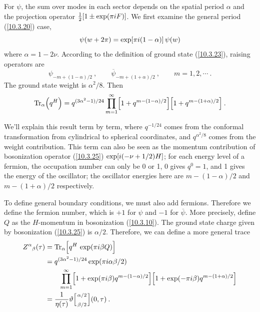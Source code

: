 	For $\psi$, the sum over modes in each sector depends on the spatial period $\alpha$ and the projection operator $\frac{1}{2}[1\pm\exp(\pi i F)]$. We first examine the general period (\ref{10.3.20}) case,
	\begin{equation}
		\psi(w+2\pi) =\exp[\pi i(1-\alpha)]\,\psi(w) \label{10.7.4}
	\end{equation}
	where $\alpha=1-2\nu$. According to the definition of ground state (\ref{10.3.23}), raising operators are
	\begin{equation}
		\psi_{-m+(1-\alpha)/2}\:,\qquad \overline{\psi}_{-m+(1+\alpha)/2}\:,   \qquad m=1,2,\cdots \:.\label{10.7.5}
	\end{equation}
	The ground state weight is $\alpha^{2}/8$. Then
	\begin{equation}
		\operatorname{Tr}_{\alpha}\Bigl(q^{H}\Bigr) = q^{(3\alpha^{2}-1)/24}\prod_{m=1}^{\infty}\Bigl[1+q^{m-(1-\alpha)/2}\Bigr]
		\Bigl[1+q^{m-(1+\alpha)/2}\Bigr]\:.\label{10.7.6}
	\end{equation}
	\begin{tcolorbox}[breakable]
		\noindent We'll explain this result term by term, where $q^{-1/24}$ comes from the conformal transformation from cylindrical to spherical coordinates, and $q^{\alpha^{2}/8}$ comes from the weight contribution. This term can also be seen as the momentum contribution of bosonization operator (\ref{10.3.25}) $\exp[i(-\nu+1/2)H]$; for each energy level of a fermion, the occupation number can only be 0 or 1, 0 gives $q^{0}=1$, and 1 gives the energy of the oscillator; the oscillator energies here are $m-(1-\alpha)/2$ and $m-(1+\alpha)/2$ respectively.
	\end{tcolorbox}
	\noindent To define general boundary conditions, we must also add fermions. Therefore we define the fermion number, which is $+1$ for $\psi$ and $-1$ for $\overline{\psi}$. More precisely, define $Q$ as the $H$-momentum in bosonization (\ref{10.3.10}). The ground state charge given by bosonization (\ref{10.3.25}) is $\alpha/2$. Therefore, we can define a more general trace
	\begin{subequations} \label{10.7.7}
		\begin{align}
			Z^{\alpha}{}_{\beta}(\tau) &= \operatorname{Tr}_{\alpha}\Bigl[q^{H}\,\exp(\pi i \beta Q)\Bigr]\label{10.7.7a} \\
			&= q^{(3\alpha^{2}-1)/24}\exp(\pi i\alpha\beta/2) \nonumber \\
			&\qquad \prod_{m=1}^{\infty}\Bigl[1+\exp(\pi i\beta)q^{m-(1-\alpha)/2}\Bigr]\Bigl[1+\exp(-\pi i\beta)q^{m-(1+\alpha)/2}\Bigr]\label{10.7.7b} \\
			& =\frac{1}{\eta(\tau)}\vartheta \Bigl[
			{\scriptstyle \alpha/2  \atop \scriptstyle  \beta/2}
			\Bigr](0,\tau) \:.  \label{10.7.7c}
		\end{align}
	\end{subequations}
